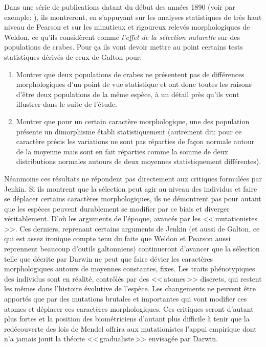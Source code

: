 Dans une série de publications datant du début des années 1890 (voir par exemple: \cite{weldon1893certaincorrelatedvariationsincrangonvulgaris}), ils montreront, en s'appuyant sur les analyses statistiques de très haut niveau de Pearson et sur les minutieux et rigoureux relevés morphologiques de Weldon, ce qu'ils considèrent comme \emph{l'effet de la sélection naturelle} sur des populations de crabes. Pour ça ils vont devoir mettre au point certains tests statistiques dérivés de ceux de Galton pour: 
\begin{enumerate}
	\item Montrer que deux populations de crabes ne présentent pas de différences morphologiques d'un point de vue statistique et ont donc toutes les raisons d'être deux populations de la même espèce, à un détail près qu'ils vont illustrer dans le suite de l'étude.
	\item Montrer que pour un certain caractère morphologique, une des population présente un dimorphisme établi statistiquement (autrement dit: pour ce caractère précis les variations ne sont pas réparties de façon normale autour de la moyenne mais sont en fait réparties comme la somme de deux distributions normales autours de deux moyennes statistiquement différentes).
\end{enumerate}

Néanmoins ces résultats ne répondent pas directement aux critiques formulées par Jenkin. Si ils montrent que la sélection peut agir au niveau des individus et faire se déplacer certains caractères morphologiques, ils ne démontrent pas pour autant que les espèces peuvent durablement se modifier par ce biais et diverger véritablement. D'où les arguments de l'époque, avancés par les <<\,mutationistes\,>>. Ces derniers, reprenant certains arguments de Jenkin (et aussi de Galton, ce qui est assez ironique compte tenu du faite que Weldon et Pearson aussi reprennent beaucoup d'outils galtonniens) continueront d'avancer que la sélection telle que décrite par Darwin ne peut que faire dévier les caractères morphologiques autours de moyennes constantes, fixes. Les traits phénotypiques des individus sont en réalité, contrôlés par des <<\,atomes\,>> discrets, qui restent les mêmes dans l'histoire évolutive de l'espèce. Les changements ne peuvent être apportés que par des mutations brutales et importantes qui vont modifier ces atomes et déplacer ces caractères morphologiques. Ces critiques seront d'autant plus fortes et la position des biométriciens d'autant plus difficile à tenir que la redécouverte des lois de Mendel offrira aux mutationistes l'appui empirique dont n'a jamais jouit la théorie <<\,gradualiste\,>> envisagée par Darwin.

